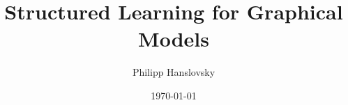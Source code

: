 




\title{Structured Learning for Graphical Models}

\author{Philipp Hanslovsky}
\date{\today}



\maketitle





\appendix %
\setcounter{finalframe}{\value{framenumber}}

% 

\setcounter{framenumber}{\value{finalframe}}





